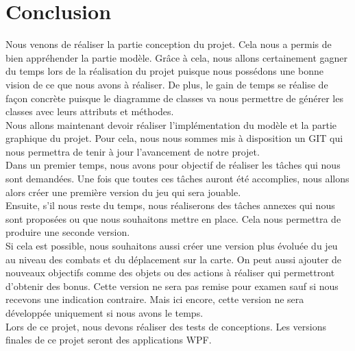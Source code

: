 \documentclass[a4paper,11pt]{article}
\begin{document}
\section{Conclusion}
Nous venons de réaliser la partie conception du projet. Cela nous a permis de bien appréhender la partie modèle. Grâce à cela, nous allons certainement gagner du temps lors de la réalisation du projet puisque nous possédons une bonne vision de ce que nous avons à réaliser. De plus, le gain de temps se réalise de façon concrète puisque le diagramme de classes va nous permettre de générer les classes avec leurs attributs et méthodes.\medskip\\
Nous allons maintenant devoir réaliser l'implémentation du modèle et la partie graphique du projet. Pour cela, nous nous sommes mis à disposition un GIT qui nous permettra de tenir à jour l'avancement de notre projet.\medskip\\
Dans un premier temps, nous avons pour objectif de réaliser les tâches qui nous sont demandées. Une fois que toutes ces tâches auront été accomplies, nous allons alors créer une première version du jeu qui sera jouable.\medskip\\
Ensuite, s'il nous reste du temps, nous réaliserons des tâches annexes qui nous sont proposées ou que nous souhaitons mettre en place. Cela nous permettra de produire une seconde version.\medskip\\
Si cela est possible, nous souhaitons aussi créer une version plus évoluée du jeu au niveau des combats et du déplacement sur la carte. On peut aussi ajouter de nouveaux objectifs comme des objets ou des actions à réaliser qui permettront d'obtenir des bonus. Cette version ne sera pas remise pour examen sauf si nous recevons une indication contraire. Mais ici encore, cette version ne sera développée uniquement si nous avons le temps.\medskip\\
Lors de ce projet, nous devons réaliser des tests de conceptions. Les versions finales de ce projet seront des applications WPF.   
\end{document}
